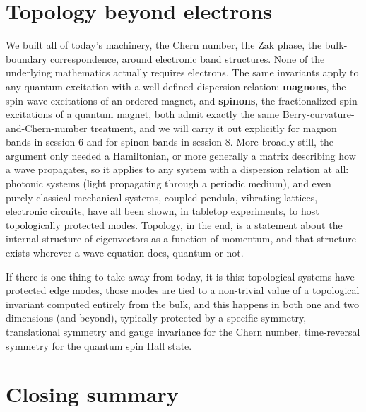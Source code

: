 \section{Topology beyond electrons}

We built all of today's machinery, the Chern number, the Zak phase, the bulk-boundary
correspondence, around electronic band structures. None of the underlying mathematics actually
requires electrons. The same invariants apply to any quantum excitation with a well-defined
dispersion relation: \textbf{magnons}, the spin-wave excitations of an ordered magnet, and \textbf{spinons},
the fractionalized spin excitations of a quantum magnet, both admit exactly the same
Berry-curvature-and-Chern-number treatment, and we will carry it out explicitly for magnon bands in
session 6 and for spinon bands in session 8. More broadly still, the argument only needed a
Hamiltonian, or more generally a matrix describing how a wave propagates, so it applies to any system
with a dispersion relation at all: photonic systems (light propagating through a periodic medium),
and even purely classical mechanical systems, coupled pendula, vibrating lattices, electronic
circuits, have all been shown, in tabletop experiments, to host topologically protected modes.
Topology, in the end, is a statement about the internal structure of eigenvectors as a function of
momentum, and that structure exists wherever a wave equation does, quantum or not.

If there is one thing to take away from today, it is this: topological systems have protected edge
modes, those modes are tied to a non-trivial value of a topological invariant computed entirely from
the bulk, and this happens in both one and two dimensions (and beyond), typically protected by a
specific symmetry, translational symmetry and gauge invariance for the Chern number, time-reversal
symmetry for the quantum spin Hall state.

\section{Closing summary}

